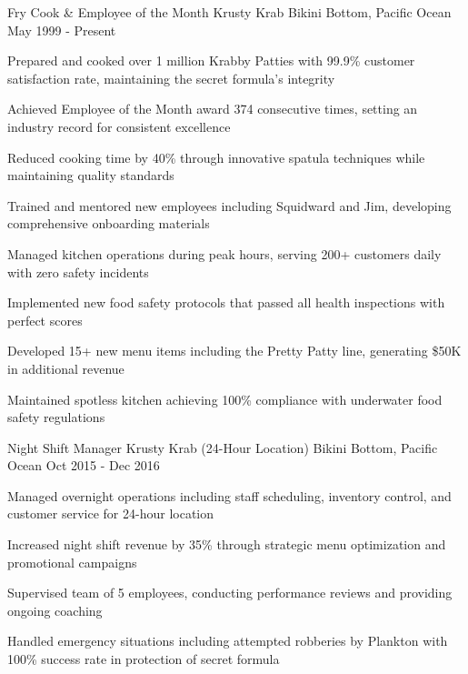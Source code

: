 \begin{cventries}

  \cventry
    {Fry Cook \& Employee of the Month} %
    {Krusty Krab} %
    {Bikini Bottom, Pacific Ocean} %
    {May 1999 - Present} %
    {
      \begin{cvitems} %
        \item {Prepared and cooked over 1 million Krabby Patties with 99.9\% customer satisfaction rate, maintaining the secret formula's integrity}
        \item {Achieved Employee of the Month award 374 consecutive times, setting an industry record for consistent excellence}
        \item {Reduced cooking time by 40\% through innovative spatula techniques while maintaining quality standards}
        \item {Trained and mentored new employees including Squidward and Jim, developing comprehensive onboarding materials}
        \item {Managed kitchen operations during peak hours, serving 200+ customers daily with zero safety incidents}
        \item {Implemented new food safety protocols that passed all health inspections with perfect scores}
        \item {Developed 15+ new menu items including the Pretty Patty line, generating \$50K in additional revenue}
        \item {Maintained spotless kitchen achieving 100\% compliance with underwater food safety regulations}
      \end{cvitems}
    }

  \cventry
    {Night Shift Manager} %
    {Krusty Krab (24-Hour Location)} %
    {Bikini Bottom, Pacific Ocean} %
    {Oct 2015 - Dec 2016} %
    {
      \begin{cvitems}
        \item {Managed overnight operations including staff scheduling, inventory control, and customer service for 24-hour location}
        \item {Increased night shift revenue by 35\% through strategic menu optimization and promotional campaigns}
        \item {Supervised team of 5 employees, conducting performance reviews and providing ongoing coaching}
        \item {Handled emergency situations including attempted robberies by Plankton with 100\% success rate in protection of secret formula}
      \end{cvitems}
    }


\end{cventries}
